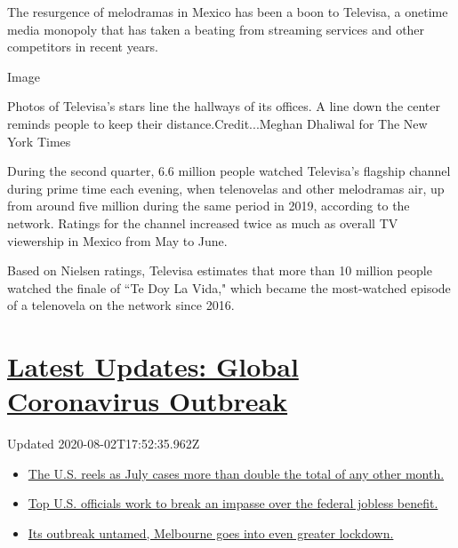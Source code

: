The resurgence of melodramas in Mexico has been a boon to Televisa, a
onetime media monopoly that has taken a beating from streaming services
and other competitors in recent years.

Image

Photos of Televisa's stars line the hallways of its offices. A line down
the center reminds people to keep their distance.Credit...Meghan
Dhaliwal for The New York Times

During the second quarter, 6.6 million people watched Televisa's
flagship channel during prime time each evening, when telenovelas and
other melodramas air, up from around five million during the same period
in 2019, according to the network. Ratings for the channel increased
twice as much as overall TV viewership in Mexico from May to June.

Based on Nielsen ratings, Televisa estimates that more than 10 million
people watched the finale of ``Te Doy La Vida," which became the
most-watched episode of a telenovela on the network since 2016.

\hypertarget{latest-updates-global-coronavirus-outbreak}{%
\section{\texorpdfstring{\href{https://www.nytimes3xbfgragh.onion/2020/08/01/world/coronavirus-covid-19.html?action=click\&pgtype=Article\&state=default\&region=MAIN_CONTENT_1\&context=storylines_live_updates}{Latest
Updates: Global Coronavirus
Outbreak}}{Latest Updates: Global Coronavirus Outbreak}}\label{latest-updates-global-coronavirus-outbreak}}

Updated 2020-08-02T17:52:35.962Z

\begin{itemize}
\tightlist
\item
  \href{https://www.nytimes3xbfgragh.onion/2020/08/01/world/coronavirus-covid-19.html?action=click\&pgtype=Article\&state=default\&region=MAIN_CONTENT_1\&context=storylines_live_updates\#link-34047410}{The
  U.S. reels as July cases more than double the total of any other
  month.}
\item
  \href{https://www.nytimes3xbfgragh.onion/2020/08/01/world/coronavirus-covid-19.html?action=click\&pgtype=Article\&state=default\&region=MAIN_CONTENT_1\&context=storylines_live_updates\#link-780ec966}{Top
  U.S. officials work to break an impasse over the federal jobless
  benefit.}
\item
  \href{https://www.nytimes3xbfgragh.onion/2020/08/01/world/coronavirus-covid-19.html?action=click\&pgtype=Article\&state=default\&region=MAIN_CONTENT_1\&context=storylines_live_updates\#link-2bc8948}{Its
  outbreak untamed, Melbourne goes into even greater lockdown.}
\end{itemize}

